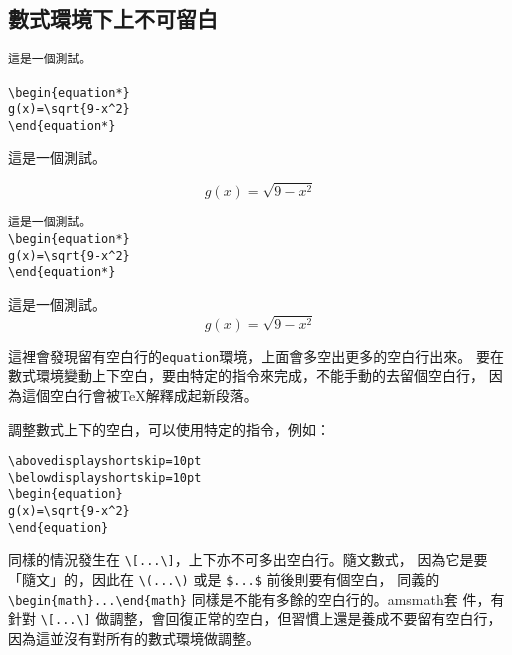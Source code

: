 \subsection{數式環境下上不可留白}

\begin{Wrong}
\begin{verbatim}
這是一個測試。

\begin{equation*}
g(x)=\sqrt{9-x^2}
\end{equation*}
\end{verbatim}
這是一個測試。

\begin{equation*}
g(x)=\sqrt{9-x^2}
\end{equation*}
\end{Wrong}

\begin{Right}
\begin{verbatim}
這是一個測試。
\begin{equation*}
g(x)=\sqrt{9-x^2}
\end{equation*}
\end{verbatim}
這是一個測試。
\begin{equation*}
g(x)=\sqrt{9-x^2}
\end{equation*}
\end{Right}

這裡會發現留有空白行的{\tt equation}環境，上面會多空出更多的空白行出來。
要在數式環境變動上下空白，要由特定的指令來完成，不能手動的去留個空白行，
因為這個空白行會被\TeX 解釋成起新段落。

調整數式上下的空白，可以使用特定的指令，例如：

\begin{Code}
\small
{}
\begin{verbatim}
\abovedisplayshortskip=10pt
\belowdisplayshortskip=10pt
\begin{equation}
g(x)=\sqrt{9-x^2}
\end{equation}
\end{verbatim}
\end{Code}

同樣的情況發生在 \verb|\[...\]|，上下亦不可多出空白行。隨文數式，
因為它是要「隨文」的，因此在 \verb|\(...\)| 或是 \verb|$...$| 前後則要有個空白，
同義的 \verb|\begin{math}...\end{math}| 同樣是不能有多餘的空白行的。{\sf amsmath}套
件，有針對 \verb|\[...\]| 做調整，會回復正常的空白，但習慣上還是養成不要留有空白行，
因為這並沒有對所有的數式環境做調整。

\marginpar{\back}
